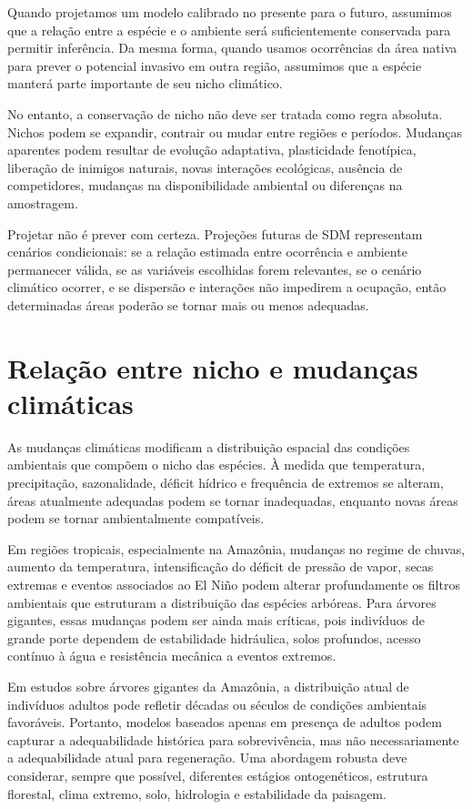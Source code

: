 Quando projetamos um modelo calibrado no presente para o futuro, assumimos que a relação entre a espécie e o ambiente será suficientemente conservada para permitir inferência. Da mesma forma, quando usamos ocorrências da área nativa para prever o potencial invasivo em outra região, assumimos que a espécie manterá parte importante de seu nicho climático.

No entanto, a conservação de nicho não deve ser tratada como regra absoluta. Nichos podem se expandir, contrair ou mudar entre regiões e períodos. Mudanças aparentes podem resultar de evolução adaptativa, plasticidade fenotípica, liberação de inimigos naturais, novas interações ecológicas, ausência de competidores, mudanças na disponibilidade ambiental ou diferenças na amostragem.

\begin{atencao}
Projetar não é prever com certeza. Projeções futuras de SDM representam cenários condicionais: se a relação estimada entre ocorrência e ambiente permanecer válida, se as variáveis escolhidas forem relevantes, se o cenário climático ocorrer, e se dispersão e interações não impedirem a ocupação, então determinadas áreas poderão se tornar mais ou menos adequadas.
\end{atencao}

\section{Relação entre nicho e mudanças climáticas}

As mudanças climáticas modificam a distribuição espacial das condições ambientais que compõem o nicho das espécies. À medida que temperatura, precipitação, sazonalidade, déficit hídrico e frequência de extremos se alteram, áreas atualmente adequadas podem se tornar inadequadas, enquanto novas áreas podem se tornar ambientalmente compatíveis.

Em regiões tropicais, especialmente na Amazônia, mudanças no regime de chuvas, aumento da temperatura, intensificação do déficit de pressão de vapor, secas extremas e eventos associados ao El Niño podem alterar profundamente os filtros ambientais que estruturam a distribuição das espécies arbóreas. Para árvores gigantes, essas mudanças podem ser ainda mais críticas, pois indivíduos de grande porte dependem de estabilidade hidráulica, solos profundos, acesso contínuo à água e resistência mecânica a eventos extremos.

\begin{aplicacao}
Em estudos sobre árvores gigantes da Amazônia, a distribuição atual de indivíduos adultos pode refletir décadas ou séculos de condições ambientais favoráveis. Portanto, modelos baseados apenas em presença de adultos podem capturar a adequabilidade histórica para sobrevivência, mas não necessariamente a adequabilidade atual para regeneração. Uma abordagem robusta deve considerar, sempre que possível, diferentes estágios ontogenéticos, estrutura florestal, clima extremo, solo, hidrologia e estabilidade da paisagem.
\end{aplicacao}

